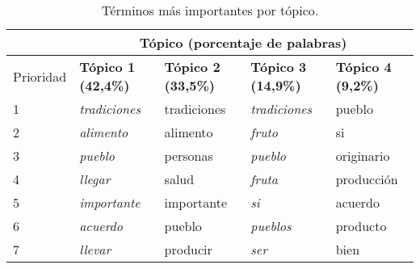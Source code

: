 \documentclass[
	spanish, %
	letterpaper, oneside
]{article}
\begin{document}
\begin{table}[htbp]
\centering
\caption{Términos más importantes por tópico.}
    \begin{tabular}{l|llll|}
        \cline{2-5}
                                                           & \multicolumn{4}{c|}{\textbf{Tópico (porcentaje de palabras)}}                                                                                                                   \\ \hline
        \multicolumn{1}{|l|}{Prioridad} & \multicolumn{1}{l|}{\textbf{Tópico 1 (42,4\%)}} & \multicolumn{1}{l|}{\textbf{Tópico 2 (33,5\%)}} & \multicolumn{1}{l|}{\textbf{Tópico 3 (14,9\%)}} & \textbf{Tópico 4 (9,2\%)} \\ \hline
        \multicolumn{1}{|l|}{1}                            & \multicolumn{1}{l|}{\textit{tradiciones}}       & \multicolumn{1}{l|}{tradiciones}                & \multicolumn{1}{l|}{\textit{tradiciones}}       & pueblo                    \\ \hline
        \multicolumn{1}{|l|}{2}                            & \multicolumn{1}{l|}{\textit{alimento}}          & \multicolumn{1}{l|}{alimento}                   & \multicolumn{1}{l|}{\textit{fruto}}             & si                        \\ \hline
        \multicolumn{1}{|l|}{3}                            & \multicolumn{1}{l|}{\textit{pueblo}}            & \multicolumn{1}{l|}{personas}                   & \multicolumn{1}{l|}{\textit{pueblo}}            & originario                \\ \hline
        \multicolumn{1}{|l|}{4}                            & \multicolumn{1}{l|}{\textit{llegar}}            & \multicolumn{1}{l|}{salud}                      & \multicolumn{1}{l|}{\textit{fruta}}             & producción                \\ \hline
        \multicolumn{1}{|l|}{5}                            & \multicolumn{1}{l|}{\textit{importante}}        & \multicolumn{1}{l|}{importante}                 & \multicolumn{1}{l|}{\textit{si}}                & acuerdo                   \\ \hline
        \multicolumn{1}{|l|}{6}                            & \multicolumn{1}{l|}{\textit{acuerdo}}           & \multicolumn{1}{l|}{pueblo}                     & \multicolumn{1}{l|}{\textit{pueblos}}           & producto                  \\ \hline
        \multicolumn{1}{|l|}{7}                            & \multicolumn{1}{l|}{\textit{llevar}}            & \multicolumn{1}{l|}{producir}                   & \multicolumn{1}{l|}{\textit{ser}}               & bien                      \\ \hline

\end{tabular}
\end{table}
\end{document}
